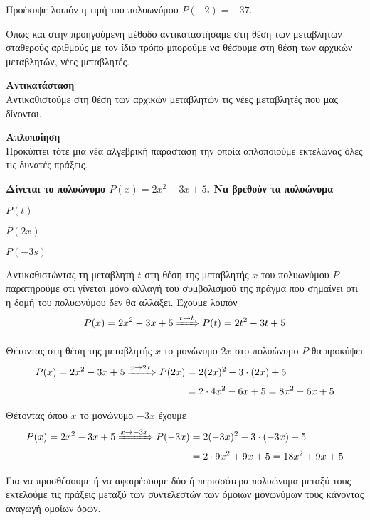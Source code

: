 \documentclass[twoside,nofonts,internet,methodoi]{thewria}
\begin{document}
Προέκυψε λοιπόν η τιμή του πολυωνύμου $ P(-2)=-37 $.
\begin{Methodos}
Όπως και στην προηγούμενη μέθοδο αντικαταστήσαμε στη θέση των μεταβλητών σταθερούς αριθμούς με τον ίδιο τρόπο μπορούμε να θέσουμε στη θέση των αρχικών μεταβλητών, νέες μεταβλητές.
\begin{bhma}
\item \textbf{Αντικατάσταση}\\
Αντικαθιστούμε στη θέση των αρχικών μεταβλητών τις νέες μεταβλητές που μας δίνονται.
\item \textbf{Απλοποίηση}\\
Προκύπτει τότε μια νέα αλγεβρική παράσταση την οποία απλοποιούμε εκτελώνας όλες τις δυνατές πράξεις.
\end{bhma}
\end{Methodos}
\textbf{Δίνεται το πολυώνυμο {\boldmath$ P(x)=2x^2-3x+5 $}. Να βρεθούν τα πολυώνυμα}
{\boldmath
\begin{multicols}{3}
\begin{brlist}
\item $ P(t) $
\item $ P(2x) $
\item $ P(-3s) $
\end{brlist}\end{multicols}}
\lysh
\begin{rlist}
\item Αντικαθιστώντας τη μεταβλητή $ t $ στη θέση της μεταβλητής $ x $ του πολυωνύμου $ P $ παρατηρούμε οτι γίνεται μόνο αλλαγή του συμβολισμού της πράγμα που σημαίνει οτι η δομή του πολυωνύμου δεν θα αλλάξει. Έχουμε λοιπόν
\[ P(x)=2x^2-3x+5\xRightarrow{x\rightarrow t}P(t)=2t^2-3t+5 \]
\item Θέτοντας στη θέση της μεταβλητής $ x $ το μονώνυμο $ 2x $ στο πολυώνυμο $ P $ θα προκύψει
\begin{align*}
 P(x)=2x^2-3x+5\xRightarrow{x\rightarrow 2x}P(2x)&=2(2x)^2-3\cdot(2x)+5\\
&=2\cdot 4x^2-6x+5=8x^2-6x+5
\end{align*}
\item Θέτοντας όπου $ x $ το μονώνυμο $ -3x $ έχουμε
\begin{align*}
 P(x)=2x^2-3x+5\xRightarrow{x\rightarrow -3x}P(-3x)&=2(-3x)^2-3\cdot(-3x)+5\\
&=2\cdot 9x^2+9x+5=18x^2+9x+5
\end{align*}
\end{rlist}
\begin{Methodos}
Για να προσθέσουμε ή να αφαιρέσουμε δύο ή περισσότερα πολυώνυμα μεταξύ τους εκτελούμε τις πράξεις μεταξύ των συντελεστών των όμοιων μονωνύμων τους κάνοντας αναγωγή ομοίων όρων.
\end{Methodos}
\end{document}
